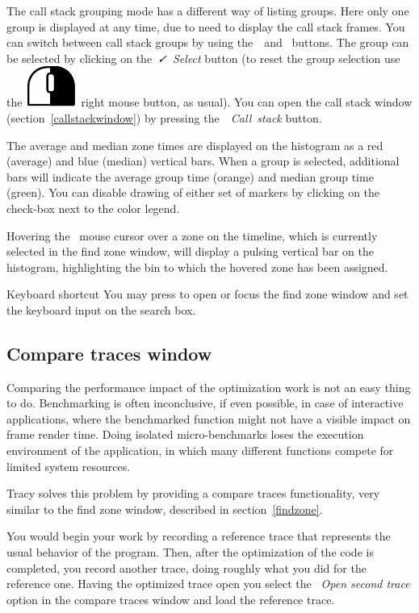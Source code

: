 \documentclass[hidelinks,titlepage,a4paper]{article}
\newcommand{\RMB}{\includegraphics[height=.8\baselineskip]{icons/rmb}}
\begin{document}
The call stack grouping mode has a different way of listing groups. Here only one group is displayed at any time, due to need to display the call stack frames. You can switch between call stack groups by using the~\faCaretLeft{}~and~\faCaretRight{} buttons. The group can be selected by clicking on the~\emph{\faCheck{}~Select} button (to reset the group selection use the~\RMB{}~right mouse button, as usual). You can open the call stack window (section~\ref{callstackwindow}) by pressing the~\emph{\faAlignJustify{}~Call~stack} button.

The average and median zone times are displayed on the histogram as a red (average) and blue (median) vertical bars. When a group is selected, additional bars will indicate the average group time (orange) and median group time (green). You can disable drawing of either set of markers by clicking on the check-box next to the color legend.

Hovering the \faMousePointer{}~mouse cursor over a zone on the timeline, which is currently selected in the find zone window, will display a pulsing vertical bar on the histogram, highlighting the bin to which the hovered zone has been assigned.

\begin{bclogo}[
noborder=true,
couleur=black!5,
logo=\bclampe
]{Keyboard shortcut}
You may press  to open or focus the find zone window and set the keyboard input on the search box.
\end{bclogo}

\subsection{Compare traces window}
\label{compare}

Comparing the performance impact of the optimization work is not an easy thing to do. Benchmarking is often inconclusive, if even possible, in case of interactive applications, where the benchmarked function might not have a visible impact on frame render time. Doing isolated micro-benchmarks loses the execution environment of the application, in which many different functions compete for limited system resources.

Tracy solves this problem by providing a compare traces functionality, very similar to the find zone window, described in section~\ref{findzone}.

You would begin your work by recording a reference trace that represents the usual behavior of the program. Then, after the optimization of the code is completed, you record another trace, doing roughly what you did for the reference one. Having the optimized trace open you select the \emph{\faFolderOpen{}~Open second trace} option in the compare traces window and load the reference trace.
\end{document}

